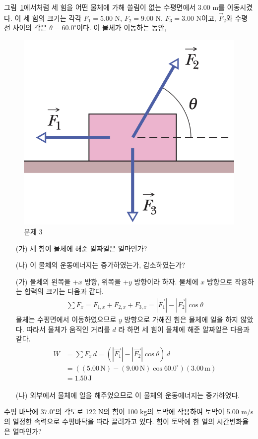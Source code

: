 \documentclass[floatfix,nofootinbib,superscriptaddress,fleqn,preprint]{revtex4}
\begin{document}
그림~\ref{fig:3}에서처럼 세 힘을 어떤 물체에 가해 쓸림이 없는
수평면에서 3.00 m를 이동시켰다. 이 세 힘의 크기는 각각
$F_1=5.00$ N, $F_2=9.00$ N, $F_3=3.00$ N이고, $\vec{F}_2$와 수평선 
사이의 각은 $\theta=60.0^\circ$이다. 이 물체가 이동하는 동안, 
\begin{figure}[ht]
  \centering
\includegraphics[scale=0.45]{Qfig7-3-20220323.png}  
  \caption{문제 3}
  \label{fig:3}
\end{figure}
\begin{itemize}
\item[(가)] 세 힘이 물체에 해준 알짜일은 얼마인가?
\item[(나)] 이 물체의 운동에너지는 증가하였는가, 감소하였는가?
\end{itemize}

\begin{itemize}
  \item [(가)] 물체의 왼쪽을 +$x$ 방향, 위쪽을 +$y$ 방향이라 하자.
   물체에 $x$ 방향으로 작용하는 합력의 크기는 다음과 같다.
   \begin{align}
     \sum F_x = F_{1,x}+F_{2,x}+F_{3,x}=|\vec{F_1}|-|\vec{F_2}|\cos{\theta}
   \end{align}
   물체는 수평면에서 이동하였으므로 $y$ 방향으로 가해진 힘은 물체에 일을 하지 않았다. 
   따라서 물체가 움직인 거리를 $d$ 라 하면 세 힘이 물체에 해준 알짜일은 다음과 같다.
   \begin{align}
    \begin{split}
      W &= \sum F_x\,d= \left(|\vec{F_1}|-|\vec{F_2}|\cos{\theta}\right)\,d \\
      &= \left((5.00\,\mathrm{N})-(9.00\,\mathrm{N})\cos{60.0^\circ}\right)
      (3.00\,\mathrm{m})  \\
      &= 1.50\,\mathrm{J}
    \end{split}
   \end{align}
  \item [(나)] 외부에서 물체에 일을 해주었으므로 이 물체의 운동에너지는 
  증가하였다.
\end{itemize}

\vspace{1.cm}

수평 바닥에 $37.0^\circ$의 각도로 122 N의 힘이 100 kg의 토막에
작용하여 토막이 5.00 m/s의 일정한 속력으로 수평바닥을 따라 끌려가고
있다. 힘이 토막에 한 일의 시간변화율은 얼마인가?

\end{document}
